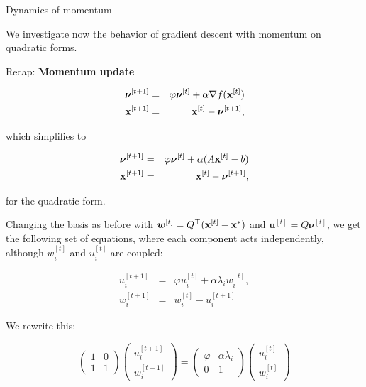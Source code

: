 \documentclass[11pt,compress,t,notes=noshow, xcolor=table]{beamer}
\begin{document}
\begin{vbframe}{Dynamics of momentum}
	
We investigate now the behavior of gradient descent with momentum on quadratic forms. 

Recap: \textbf{Momentum update}

\begin{eqnarray*}
 \boldsymbol{\nu}^{[ t+1 ] } &=& \varphi \boldsymbol{\nu}^{[ t ] } + \alpha \nabla f(\mathbf{x}^{[ t ] }) \\
 \mathbf{x}^{[ t+1 ] } &=& \mathbf{x}^{[ t ] } - \boldsymbol{\nu}^{[ t+1 ] }, 
\end{eqnarray*}

which simplifies to 

\begin{eqnarray*}
	\boldsymbol{\nu}^{[ t+1 ] } &=& \varphi \boldsymbol{\nu}^{[ t ] } + \alpha (A \mathbf{x}^{[ t ] } - b)  \\
	\mathbf{x}^{[ t+1 ] } &=& \mathbf{x}^{[ t ] } - \boldsymbol{\nu}^{[ t+1 ] }, 
\end{eqnarray*}

for the quadratic form. 

\framebreak

Changing the basis as before with $\boldsymbol{w}^{[ t ] } = Q^\top (\mathbf{x}^{[ t ] } - \mathbf{x}^\ast)$ and $\boldsymbol{u}^{[ t ] } = Q \boldsymbol{\nu}^{[ t ] }$, we get the following set of equations, where each component acts independently, although $w_i^{[ t ] }$ and $u_i^{[ t ] }$ are coupled: 

\begin{eqnarray*}
	u_i^{[ t+1 ] } &=& \varphi u_i^{[ t ] } + \alpha \lambda_i w_i^{[ t ] }, \\
	w_i^{[ t+1 ] } &=& w_i^{[ t ] } - u_i^{[ t+1 ] }
\end{eqnarray*}

We rewrite this: 

\begin{equation*}
\begin{pmatrix}
	1 & 0 \\
	1 & 1 
\end{pmatrix}  \begin{pmatrix}
u_i^{[ t+1 ] } \\
w_i^{[ t+1 ] }
\end{pmatrix} = 
\begin{pmatrix}
	\varphi & \alpha \lambda_i \\
	0 & 1 
\end{pmatrix}  \begin{pmatrix}
	u_i^{[ t ] } \\
	w_i^{[ t ] }
\end{pmatrix}
\end{equation*}


\end{vbframe}
\end{document}
